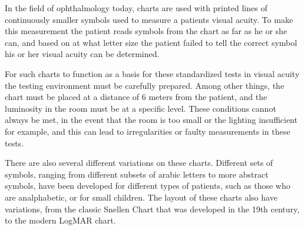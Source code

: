 \documentclass{article}
\begin{document}


In the field of ophthalmology today, charts are used with printed lines of continuously smaller symbols used to measure a patients visual acuity. To make this measurement the patient reads symbols from the chart as far as he or she can, and based on at what letter size the patient failed to tell the correct symbol his or her visual acuity can be determined. 


For such charts to function as a basis for these standardized tests in visual acuity the testing environment must be carefully prepared. Among other things, the chart must be placed at a distance of 6 meters from the patient, and the luminosity in the room must be at a specific level. These conditions cannot always be met, in the event that the room is too small or the lighting insufficient for example, and this can lead to irregularities or faulty measurements in these tests. 


There are also several different variations on these charts. Different sets of symbols, ranging from different subsets of arabic letters to more abstract symbols, have been developed for different types of patients, such as those who are analphabetic, or for small children. The layout of these charts also have variations, from the classic Snellen Chart that was developed in the 19th century, to the modern LogMAR chart.
\end{document}
